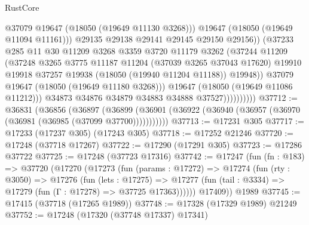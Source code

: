 \begin{lexlean}{RustCore}
\begin{coremodule}
                                  @37079
                                  @19647
                                  (@18050 (@19649 @11130 @3268)))
                                @19647
                                (@18050 (@19649 @11094 @11161)))
                              @29135
                              @29138
                              @29141
                              @29145
                              @29150
                              @29156))
                          (@37233
                            @285
                            @11
                            @30
                            @11209
                            @3268
                            @3359
                            @3720
                            @11179
                            @3262
                            (@37244
                              @11209
                              (@37248
                                @3265
                                @3775
                                @11187
                                @11204
                                (@37039 @3265 @37043 @17620)
                                @19910
                                @19918
                                @37257
                                @19938
                                (@18050 (@19940 @11204 @11188))
                                @19948))
                            @37079
                            @19647
                            (@18050 (@19649 @11180 @3268)))
                          @19647
                          (@18050 (@19649 @11086 @11212)))
                        @34873
                        @34876
                        @34879
                        @34883
                        @34888
                        @37527))))))))))
@37712 := @36831
    (@36856
      (@36897
        (@36899 (@36901 (@36922 (@36940 (@36957 (@36970 (@36981 (@36985 (@37099 @37700)))))))))))
@37713 := @17231 @305
@37717 := @17233 (@17237 @305) (@17243 @305)
@37718 := @17252 @21246
@37720 := @17248 (@37718 @17267)
@37722 := @17290 (@17291 @305)
@37723 := @17286 @37722
@37725 := @17248 (@37723 @17316)
@37742 := @17247
    (fun (fn : @183) =>
    @37720
      (@17270
        (@17273
          (fun (params : @17272) =>
          @17274
            (fun (rty : @3050) =>
            @17276
              (fun (lets : @17275) =>
              @17277 (fun (tail : @3334) => @17279 (fun (Γ : @17278) => @37725 @17363))))))
        @17409))
    @1989
@37745 := @17415 (@37718 (@17265 @1989))
@37748 := @17328 (@17329 @1989) @21249
@37752 := @17248 (@17320 (@37748 @17337) @17341)

\end{coremodule}
\end{lexlean}
